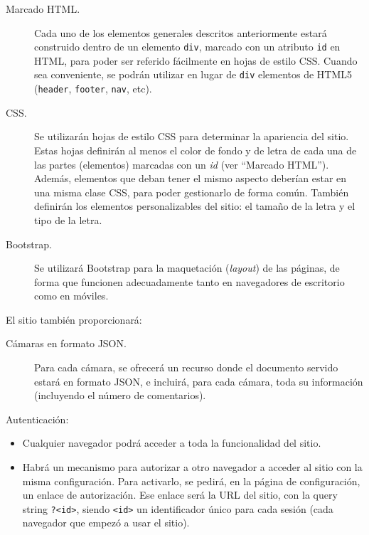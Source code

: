 \begin{description}
\item[Marcado HTML.] Cada uno de los elementos generales descritos anteriormente estará construido dentro de un elemento \texttt{div}, marcado con un atributo \texttt{id} en HTML, para poder ser referido fácilmente en hojas de estilo CSS. Cuando sea conveniente, se podrán utilizar en lugar de \texttt{div} elementos de HTML5 (\texttt{header}, \texttt{footer}, \texttt{nav}, etc).

\item[CSS.] Se utilizarán hojas de estilo CSS para determinar la apariencia del sitio. Estas hojas definirán al menos el color de fondo y de letra de cada una de las partes (elementos) marcadas con un \emph{id} (ver ``Marcado HTML''). Además, elementos que deban tener el mismo aspecto deberían estar en una misma clase CSS, para poder gestionarlo de forma común. También definirán los elementos personalizables del sitio: el tamaño de la letra y el tipo de la letra.

\item[Bootstrap.] Se utilizará Bootstrap para la maquetación (\emph{layout}) de las páginas, de forma que funcionen adecuadamente tanto en navegadores de escritorio como en móviles.
\end{description}

El sitio también proporcionará:

\begin{description}
\item[Cámaras en formato JSON.] Para cada cámara, se ofrecerá un recurso donde el documento servido estará en formato JSON, e incluirá, para cada cámara, toda su información (incluyendo el número de comentarios).

\end{description}


Autenticación:

\begin{itemize}

\item Cualquier navegador podrá acceder a toda la funcionalidad del sitio.

\item Habrá un mecanismo para autorizar a otro navegador a acceder al sitio con la misma configuración. Para activarlo, se pedirá, en la página de configuración, un enlace de autorización. Ese enlace será la URL del sitio, con la query string \verb|?<id>|, siendo \verb|<id>| un identificador único para cada sesión (cada navegador que empezó a usar el sitio). 

\end{itemize}

